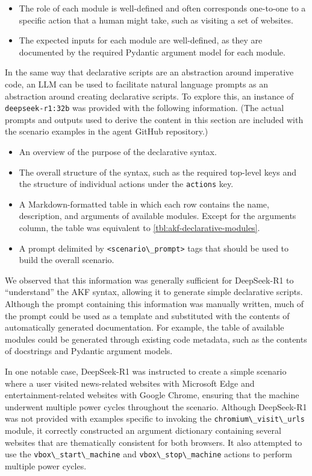\documentclass[preprint,12pt]{elsarticle}
\newcommand{\passthrough}[1]{#1}
\begin{document}
\begin{itemize}
\item
  The role of each module is well-defined and often corresponds
  one-to-one to a specific action that a human might take, such as
  visiting a set of websites.
\item
  The expected inputs for each module are well-defined, as they are
  documented by the required Pydantic argument model for each module.
\end{itemize}

In the same way that declarative scripts are an abstraction around
imperative code, an LLM can be used to facilitate natural language
prompts as an abstraction around creating declarative scripts. To
explore this, an instance of \passthrough{\lstinline!deepseek-r1:32b!}
was provided with the following information. (The actual prompts and
outputs used to derive the content in this section are included with the
scenario examples in the agent GitHub repository.)

\begin{itemize}
\item
  An overview of the purpose of the declarative syntax.
\item
  The overall structure of the syntax, such as the required top-level
  keys and the structure of individual actions under the
  \passthrough{\lstinline!actions!} key.
\item
  A Markdown-formatted table in which each row contains the name,
  description, and arguments of available modules. Except for the
  arguments column, the table was equivalent to
  \autoref{tbl:akf-declarative-modules}.
\item
  A prompt delimited by \passthrough{\lstinline!<scenario\_prompt>!}
  tags that should be used to build the overall scenario.
\end{itemize}

We observed that this information was generally sufficient for
DeepSeek-R1 to ``understand'' the AKF syntax, allowing it to generate
simple declarative scripts. Although the prompt containing this
information was manually written, much of the prompt could be used as a
template and substituted with the contents of automatically generated
documentation. For example, the table of available modules could be
generated through existing code metadata, such as the contents of
docstrings and Pydantic argument models.

In one notable case, DeepSeek-R1 was instructed to create a simple
scenario where a user visited news-related websites with Microsoft Edge
and entertainment-related websites with Google Chrome, ensuring that the
machine underwent multiple power cycles throughout the scenario.
Although DeepSeek-R1 was not provided with examples specific to invoking
the \passthrough{\lstinline!chromium\_visit\_urls!} module, it correctly
constructed an argument dictionary containing several websites that are
thematically consistent for both browsers. It also attempted to use the
\passthrough{\lstinline!vbox\_start\_machine!} and
\passthrough{\lstinline!vbox\_stop\_machine!} actions to perform
multiple power cycles.
\end{document}

